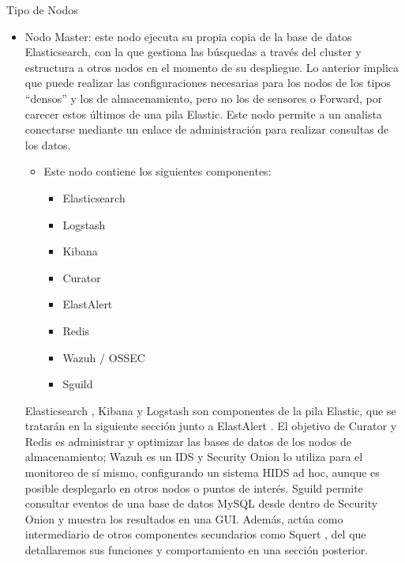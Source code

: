     \begin{subsubsection}{Tipo de Nodos}
        \begin{itemize}
          \item Nodo Master: este nodo ejecuta su propia copia de la base de datos Elasticsearch, con la que gestiona las búsquedas a través del cluster y estructura a otros nodos en el momento de su despliegue. Lo anterior implica que puede realizar las configuraciones necesarias para los nodos de los tipos “densos” y los de almacenamiento, pero no los de sensores o Forward, por carecer estos últimos de una pila Elastic. Este nodo permite a un analista conectarse mediante un enlace de administración para realizar consultas de los datos.
          \begin{itemize}
              \item  Este nodo contiene los siguientes componentes:
              \begin{itemize}
                  \item Elasticsearch \cite{elastic}
                  \item Logstash \cite{elastic}
                  \item Kibana \cite{elastic}
                  \item Curator \cite{curator}
                  \item ElastAlert \cite{elasalert}
                  \item Redis \cite{redis}
                  \item Wazuh \cite{wazuh} / OSSEC \cite{ossec}
                  \item Sguild \cite{sguil}
              \end{itemize}
          \end{itemize}
          Elasticsearch \cite{elastic}, Kibana \cite{elastic} y Logstash \cite{elastic} son componentes de la pila Elastic, que se tratarán en la siguiente sección junto a ElastAlert \cite{elasalert}. El objetivo de Curator \cite{curator} y Redis \cite{redis} es administrar y optimizar las bases de datos de los nodos de almacenamiento; Wazuh \cite{wazuh} es un IDS y Security Onion lo utiliza para el monitoreo de sí mismo, configurando un sistema HIDS ad hoc, aunque es posible desplegarlo en otros nodos o puntos de interés. Sguild \cite{sguil} permite consultar eventos de una base de datos MySQL desde dentro de Security Onion y muestra los resultados en una GUI. Además, actúa como intermediario de otros componentes secundarios como Squert \cite{squert}, del que detallaremos sus funciones y comportamiento en una sección posterior. 

\end{itemize}
\end{subsubsection}
